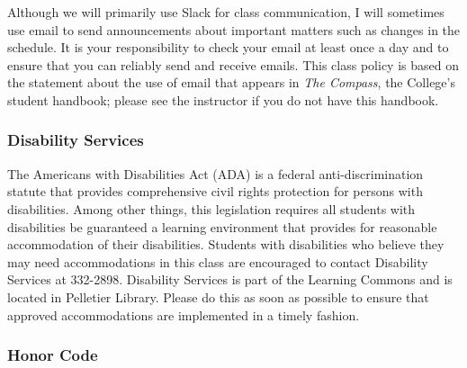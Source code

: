 Although we will primarily use Slack for class communication, I will sometimes use email to send announcements about
important matters such as changes in the schedule. It is your responsibility to check your email at least once a day and to
ensure that you can reliably send and receive emails. This class policy is based on the statement about the use of email that
appears in {\em The Compass}, the College's student handbook; please see the instructor if you do not have this
handbook.



\subsubsection*{Disability Services}

The Americans with Disabilities Act (ADA) is a federal anti-discrimination statute that provides comprehensive civil
rights protection for persons with disabilities.  Among other things, this legislation requires all students with
disabilities be guaranteed a learning environment that provides for reasonable accommodation of their disabilities.
Students with disabilities who believe they may need accommodations in this class are encouraged to contact Disability
Services at 332-2898.  Disability Services is part of the Learning Commons and is located in Pelletier Library.
Please do this as soon as possible to ensure that approved accommodations are implemented in a timely fashion.

\subsubsection*{Honor Code}

